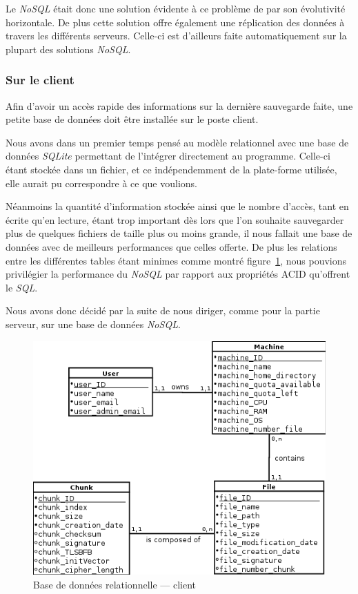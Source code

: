 \documentclass[a4paper,10pt, twoside]{report}
\begin{document}
\begin{spacing}{1.2}
Le \textit{NoSQL} \'etait donc une solution \'evidente \`a ce probl\`eme de par
son \'evolutivit\'e horizontale. De plus cette solution offre \'egalement une
r\'eplication des donn\'ees \`a travers les diff\'erents serveurs. Celle-ci
est d'ailleurs faite automatiquement sur la plupart des solutions
\textit{NoSQL}.

\subsubsection{Sur le client}
Afin d'avoir un acc\`es rapide des informations sur la derni\`ere sauvegarde
faite, une petite base de donn\'ees doit \^etre install\'ee sur le poste client.

Nous avons dans un premier temps pens\'e au mod\`ele relationnel avec une base
de donn\'ees \textit{SQLite} permettant de l'int\'egrer directement au
programme. Celle-ci \'etant stock\'ee dans un fichier, et ce ind\'ependemment
de la plate-forme utilis\'ee, elle aurait pu correspondre \`a ce que voulions.

N\'eanmoins la quantit\'e d'information stock\'ee ainsi que le nombre d'acc\`es,
tant en \'ecrite qu'en lecture, \'etant trop important d\`es lors que l'on
souhaite sauvegarder plus de quelques fichiers de taille plus ou moins grande,
il nous fallait une base de donn\'ees avec de meilleurs performances que celles
offerte. De plus les relations entre les diff\'erentes tables \'etant minimes
comme montr\'e figure~\ref{dbRelClient}, nous pouvions privil\'egier la
performance du \textit{NoSQL} par rapport aux propri\'et\'es ACID qu'offrent
le \textit{SQL}.

Nous avons donc d\'ecid\'e par la suite de nous diriger, comme pour la partie
serveur, sur une base de donn\'ees \textit{NoSQL}.

\begin{figure}[h!]
  \centering
  \includegraphics[scale=0.69]{softwareDesign/dbRelClient.png}
  \caption{\label{dbRelClient} Base de donn\'ees relationnelle --- client}
\end{figure}


\end{spacing}
\end{document}
